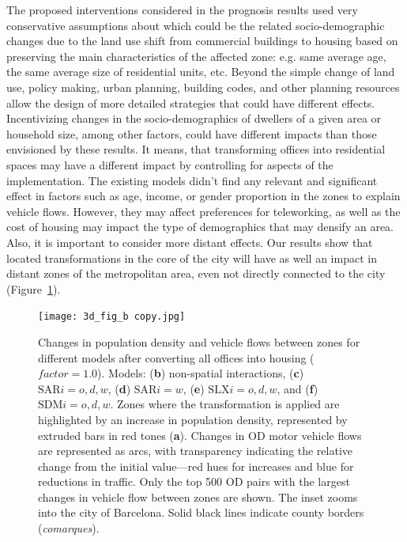 The proposed interventions considered in the prognosis results used very conservative assumptions about which could be the related socio-demographic changes due to the land use shift from commercial buildings to housing based on preserving the main characteristics of the affected zone: e.g. same average age, the same average size of residential units, etc. Beyond the simple change of land use, policy making, urban planning, building codes, and other planning resources allow the design of more detailed strategies that could have different effects. Incentivizing changes in the socio-demographics of dwellers of a given area or household size, among other factors, could have different impacts than those envisioned by these results. It means, that transforming offices into residential spaces may have a different impact by controlling for aspects of the implementation. The existing models didn't find any relevant and significant effect in factors such as age, income, or gender proportion in the zones to explain vehicle flows. However, they may affect preferences for teleworking, as well as the cost of housing may impact the type of demographics that may densify an area. Also, it is important to consider more distant effects. Our results show that located transformations in the core of the city will have as well an impact in distant zones of the metropolitan area, even not directly connected to the city (Figure~\ref{fig:3d}).

\begin{figure}[h!]
    \centering
    \texttt{[image: 3d\_fig\_b copy.jpg]}
    \caption{Changes in population density and vehicle flows between zones for different models after converting all offices into housing ($\mathit{factor}=1.0$). Models: (\textbf{b}) non-spatial interactions, (\textbf{c}) $\text{SAR}{i=o,d,w}$, (\textbf{d}) $\text{SAR}{i=w}$, (\textbf{e}) $\text{SLX}{i=o,d,w}$, and (\textbf{f}) $\text{SDM}{i=o,d,w}$. Zones where the transformation is applied are highlighted by an increase in population density, represented by extruded bars in red tones (\textbf{a}). Changes in OD motor vehicle flows are represented as arcs, with transparency indicating the relative change from the initial value—red hues for increases and blue for reductions in traffic. Only the top 500 OD pairs with the largest changes in vehicle flow between zones are shown. The inset zooms into the city of Barcelona. Solid black lines indicate county borders (\textit{comarques}).}
    \label{fig:3d}
\end{figure}

